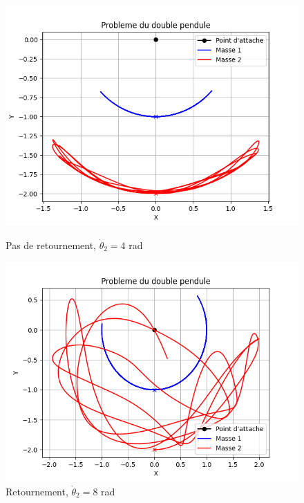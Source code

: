 \begin{figure} [htbp!]
	\begin{minipage}[c]{0.45\textwidth}
		\centering
		\includegraphics[width=\textwidth]{res/no_retournement.png}
		\caption{Pas de retournement, $\dot \theta_2 = 4$ rad}
		\label{fig:no_retournement}
	\end{minipage}\hfill
	\begin{minipage}[c]{0.45\textwidth}
		\centering
		\includegraphics[width=\textwidth]{res/retournement.png}
		\caption{Retournement, $\dot \theta_2 = 8$ rad}
		\label{fig:retournement}
	\end{minipage}
\end{figure}
